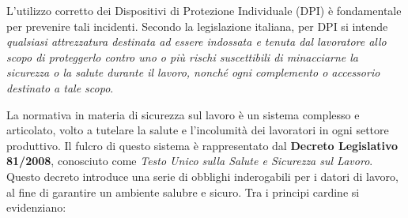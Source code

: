  
\noindent L'utilizzo corretto dei Dispositivi di Protezione Individuale (DPI) è fondamentale per prevenire tali incidenti. Secondo la legislazione italiana, per DPI si intende \emph{qualsiasi attrezzatura destinata ad essere indossata e tenuta dal lavoratore allo scopo di proteggerlo contro uno o più rischi suscettibili di minacciarne la sicurezza o la salute durante il lavoro, nonché ogni complemento o accessorio destinato a tale scopo}\cite{a3decreto81}.

\medskip

\noindent La normativa in materia di sicurezza sul lavoro è un sistema complesso e articolato, volto a tutelare la salute e l'incolumità dei lavoratori in ogni settore produttivo. Il fulcro di questo sistema è rappresentato dal \textbf{Decreto Legislativo 81/2008}, conosciuto come \emph{Testo Unico sulla Salute e Sicurezza sul Lavoro}. Questo decreto introduce una serie di obblighi inderogabili per i datori di lavoro, al fine di garantire un ambiente salubre e sicuro. Tra i principi cardine si evidenziano:

